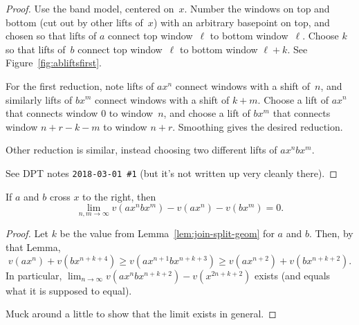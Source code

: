 \begin{figure}
\end{figure}

\begin{figure}
\end{figure}


\begin{figure}
\end{figure}

\begin{figure}
\end{figure}



\begin{proof}
  Use the band model, centered on~$x$.
  Number the windows on top and bottom (cut out by other lifts of~$x$)
  with an arbitrary basepoint on top, and chosen so that lifts of $a$ connect
  top window~$\ell$ to bottom window~$\ell$. Choose $k$ so that lifts
  of~$b$ connect top window~$\ell$ to bottom window $\ell+k$.
  See Figure~\ref{fig:abliftsfirst}.
  
  \begin{figure}
\end{figure}

  For the first reduction, note
  lifts of $a x^n$ connect windows with a shift of~$n$, and
  similarly lifts of $b x^m$ connect windows with a shift of $k+m$.
  Choose a lift of $a x^n$ that connects window $0$ to window~$n$,
  and choose a lift of $b x^m$ that connects window $n+r-k-m$ to
  window $n+r$. Smoothing gives the desired reduction.

  Other reduction is similar, instead choosing two different lifts of
  $a x^n b x^m$.
  
  See DPT notes \texttt{2018-03-01 \#1} (but it's not written up very
  cleanly there).
\end{proof}

\begin{proposition}\label{prop:join-split-alg}
  If $a$ and $b$ cross $x$ to the right, then
  \[
    \lim_{n,m\to \infty} v(a x^n b x^m) - v(ax^n) - v(bx^m) = 0.
  \]
\end{proposition}
\begin{proof}
  Let $k$ be the value from Lemma~\ref{lem:join-split-geom} for $a$ and
  $b$. Then, by that Lemma,
  \[
    v(a x^n) + v(b x^{n+k+4}) \ge v(a x^{n+1} b x^{n+k+3})
      \ge v(a x^{n+2}) + v(b x^{n+k+2}).
  \]
  In particular,
  $\lim_{n \to \infty} v(a x^n b x^{n+k+2}) - v(x^{2n+k+2})$ exists
  (and equals what it is supposed to equal).

  Muck around a little to show that the limit exists in general.
\end{proof}

